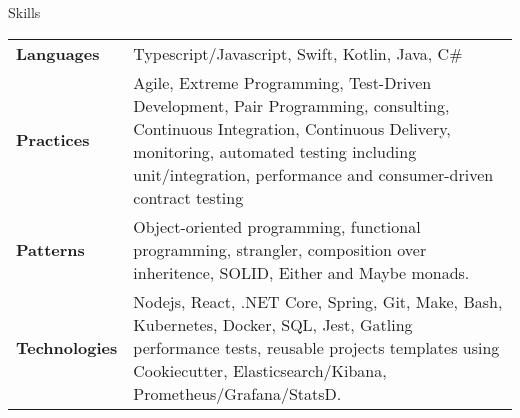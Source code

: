 \begin{section}{Skills}
  \begin{tabularx}{\linewidth}{@{}l X@{}}
    \textbf{Languages} &\small{Typescript/Javascript, Swift, Kotlin, Java, C\#} \\
    \textbf{Practices} &\small{Agile, Extreme Programming, Test-Driven Development, Pair Programming, consulting, Continuous Integration, Continuous Delivery, monitoring, automated testing including unit/integration, performance and consumer-driven contract testing} \\
    \textbf{Patterns} &\small{Object-oriented programming, functional programming, strangler, composition over inheritence, SOLID, Either and Maybe monads.} \\
    \textbf{Technologies} &\small{Nodejs, React, .NET Core, Spring, Git, Make, Bash, Kubernetes, Docker, SQL, Jest, Gatling performance tests, reusable projects templates using Cookiecutter, Elasticsearch/Kibana, Prometheus/Grafana/StatsD.} \\ 
  \end{tabularx}
\end{section}
